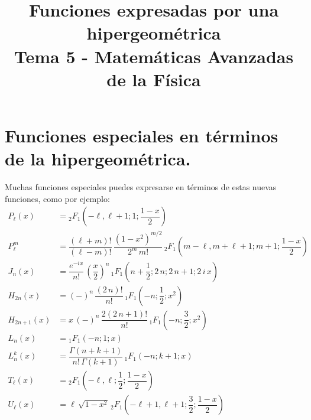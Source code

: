 
\setlength{\jot}{12pt}
\title{Funciones expresadas por una hipergeométrica \\ {\large Tema 5 - Matemáticas Avanzadas de la Física}\vspace{-1.5\baselineskip}}
\author{}
\date{}

\maketitle
\fontsize{14}{14}\selectfont
\section{Funciones especiales en términos de la hipergeométrica.}
Muchas funciones especiales puedes expresarse en términos de estas nuevas funciones, como por ejemplo:
\begin{align*}
P_{\ell} (x) &= {}_{2}F_{1} \left( -\ell , \ell + 1; 1; \dfrac{1 - x}{2} \right) \\[1em]
P_{\ell}^{m} &= \dfrac{(\ell + m)!}{(\ell - m)!} \, \dfrac{(1 - x^{2})^{m/2}}{2^{m} \, m!} \, {}_{2}F_{1} \left( m - \ell, m + \ell + 1; m + 1; \dfrac{1 - x}{2} \right) \\[1em]
J_{n} (x) &= \dfrac{e^{-i x}}{n!} \, \left( \dfrac{x}{2} \right)^{n} \, {}_1 F_{1} \left( n + \dfrac{1}{2}; 2 \, n; 2 \, n + 1; 2 \, i \, x \right) \\[1em]
H_{2 n} (x) &= (-)^{n} \, \dfrac{(2 \, n)!}{n!} \, {}_1 F_{1} \left( -n; \dfrac{1}{2}; x^{2} \right) \\[1em]
H_{2 n+1} (x) &= x \, (-)^{n} \, \dfrac{2 (2 \, n + 1)!}{n!} \, {}_1 F_{1} \left( -n; \dfrac{3}{2}; x^{2}\right) \\[1em]
L_{n} (x) &= {}_{1} F_{1} (-n; 1; x)\\[1em]
L_{n}^{k} (x) &= \dfrac{\Gamma (n +  k + 1)}{n! \, \Gamma (k + 1)} \, {}_{1} F_{1} (-n; k + 1; x) \\[1em]
T_{\ell} (x) &= {}_{2} F_{1} \left( -\ell, \ell; \dfrac{1}{2}; \dfrac{1 - x}{2} \right) \\[1em]
U_{\ell}(x) &= \ell \,\sqrt{1- x^{2}} \, {}_{2} F_{1} \left( -\ell + 1, \ell+1; \dfrac{3}{2}; \dfrac{1-x}{2} \right)
\end{align*}
